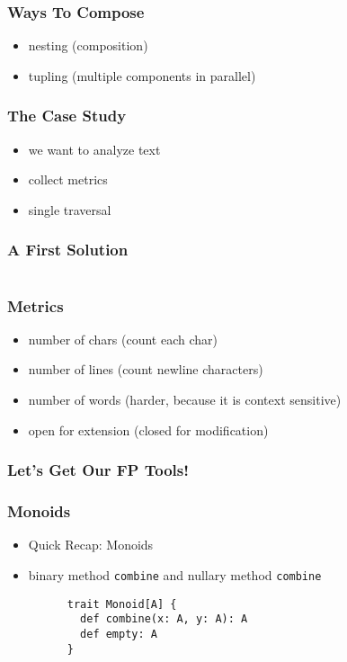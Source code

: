 \documentclass{beamer}
\begin{document}
\begin{frame}
  \frametitle{Ways To Compose}
  \begin{itemize}
  \item nesting (composition)
  \item tupling (multiple components in parallel)
  \end{itemize}
\end{frame}

\begin{frame}
  \frametitle{The Case Study}
  \begin{itemize}
  \item we want to analyze text
  \item collect metrics
  \item single traversal
  \end{itemize}
\end{frame}

\begin{frame}[fragile]
  \frametitle{A First Solution}
  \inputminted[fontsize=\small]{scala}{snippets/imperative-wc.scala}
\end{frame}

\begin{frame}
  \frametitle{Metrics}
  \begin{itemize}
  \item number of chars (count each char)
  \item number of lines (count newline characters)
  \item number of words (harder, because it is context sensitive)
  \item open for extension (closed for modification)
  \end{itemize}
\end{frame}

\begin{frame}
  \frametitle{Let's Get Our FP Tools!}
\end{frame}

\begin{frame}
  \frametitle{Monoids}
  \begin{itemize}
  \item Quick Recap: Monoids
  \item binary method \texttt{combine} and nullary method \texttt{combine}
    \begin{verbatim}
      trait Monoid[A] {
        def combine(x: A, y: A): A
        def empty: A
      }
    \end{verbatim}
  \end{itemize}
\end{frame}
\end{document}
